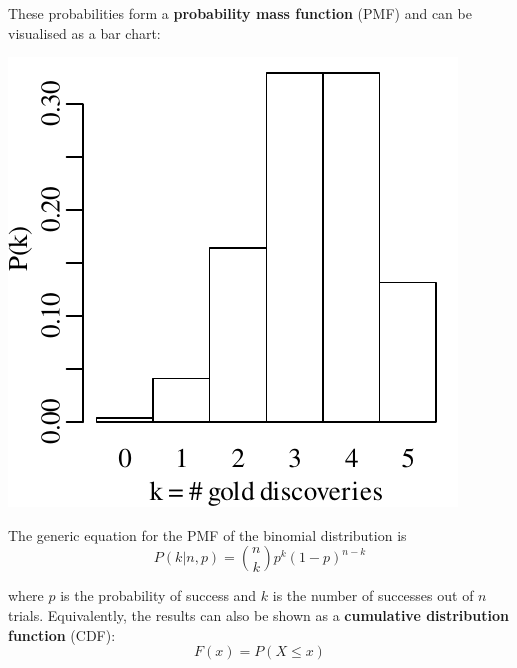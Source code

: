 These probabilities form a \textbf{probability mass function} (PMF)
and can be visualised as a bar chart:

\noindent\begin{minipage}[t][][b]{.3\textwidth}
\includegraphics[]{../figures/goldbarplot.pdf}
\medskip
\end{minipage}
\begin{minipage}[t][][t]{.7\textwidth}
  \label{fig:goldbar}
\end{minipage}

The generic equation for the PMF of the binomial distribution is
\begin{equation}
  P(k|n,p) = \binom{n}{k} p^k (1-p)^{n-k}
  \label{eq:binom}
\end{equation}

\noindent where $p$ is the probability of success and $k$ is the
number of successes out of $n$ trials. Equivalently, the results can
also be shown as a \textbf{cumulative distribution function} (CDF):
\begin{equation}
  F(x) = P(X \leq x)
  \label{eq:CDF}
\end{equation}

